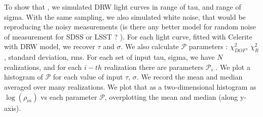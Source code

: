 \documentclass[fleqn,usenatbib]{mnras}  %
\begin{document}
To show that ,  we  simulated  DRW light curves in range of tau, and range of sigma.  With the same sampling, we also simulated white noise, that would be reproducing the  noisy measurements (is there any better model for random noise of measurement  for SDSS  or LSST  ? ). For each light curve, fitted with Celerite with DRW model,  we recover $\tau$ and $\sigma$.  We also calculate $\mathcal{P}$ parameters : $\chi^{2}_{DOF}$, $\chi^{2}_{R}$, standard deviation,  rms.  For each set of input tau, sigma,  we have $N$ realizations, and for each $i-th$ realization there are parameters  $\mathcal{P}_{i}$ . We plot a histogram of $\mathcal{P}$ for each value of input $\tau$, $\sigma$. We record the mean and median averaged over many realizations. We plot that as  a two-dimensional histogram as  $\log{(\rho_{in})}$  vs each parameter $\mathcal{P}$, overplotting the mean and median (along y-axis). 


 









\bsp	%
\label{lastpage}
\end{document}
